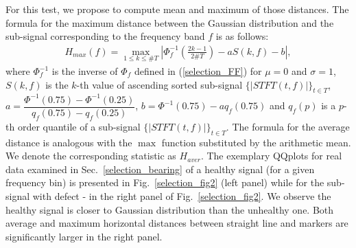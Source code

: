 For this test, we propose to compute mean and maximum of those distances. The formula for the maximum distance between the Gaussian distribution and the sub-signal corresponding to the frequency band $f$ is as follows:
\begin{eqnarray}
H_{max}(f)=\max_{1\leq k \leq \#T}{ \left| \Phi^{-1}_f\left( \frac{2k-1}{2\#T} \right) - a S(k,f)-b \right| },
\end{eqnarray}
where $\Phi_f^{-1}$ is the inverse of $\Phi_f$ defined in (\ref{selection_FF}) for $\mu=0$ and $\sigma=1$, $S(k,f)$ is the $k$-th value of ascending sorted sub-signal $\{|STFT(t,f)|\}_{t\in T}$, $a=\dfrac{\Phi^{-1}(0.75)-\Phi^{-1}(0.25)}{q_{f}(0.75)-q_{f}(0.25)}$, $b=\Phi^{-1}(0.75)-aq_{f}(0.75)$ and $q_{f}(p)$ is a $p$-th order quantile of a sub-signal $\{|STFT(t,f)|\}_{t\in T}$. The formula for the average distance is analogous with the $\max$ function substituted by the arithmetic mean. We denote the corresponding statistic as $H_{aver}$. The exemplary QQplots  for real data examined in Sec.~\ref{selection_bearing} of a healthy signal (for a given frequency bin) is presented in Fig.~\ref{selection_fig2} (left panel) while for the sub-signal with defect - in the right panel of Fig.~\ref{selection_fig2}. We observe the healthy signal is closer to Gaussian distribution than the unhealthy one. Both average and maximum horizontal distances between straight line and markers are significantly larger in the right panel.
